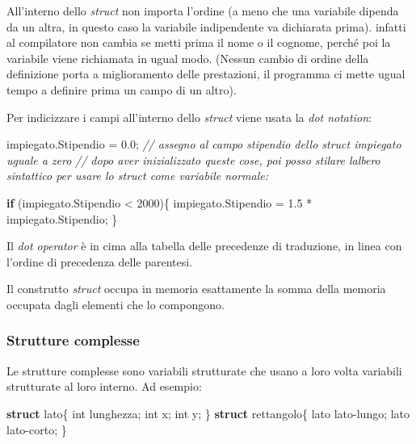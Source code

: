 \documentclass[
]{article}
\newenvironment{Shaded}{}{}
\newcommand{\CommentTok}[1]{\textcolor[rgb]{0.38,0.63,0.69}{\textit{#1}}}
\newcommand{\ControlFlowTok}[1]{\textcolor[rgb]{0.00,0.44,0.13}{\textbf{#1}}}
\newcommand{\DataTypeTok}[1]{\textcolor[rgb]{0.56,0.13,0.00}{#1}}
\newcommand{\DecValTok}[1]{\textcolor[rgb]{0.25,0.63,0.44}{#1}}
\newcommand{\FloatTok}[1]{\textcolor[rgb]{0.25,0.63,0.44}{#1}}
\newcommand{\KeywordTok}[1]{\textcolor[rgb]{0.00,0.44,0.13}{\textbf{#1}}}
\newcommand{\NormalTok}[1]{#1}
\begin{document}
All'interno dello \emph{struct} non importa l'ordine (a meno che una
variabile dipenda da un altra, in questo caso la variabile indipendente
va dichiarata prima). infatti al compilatore non cambia se metti prima
il nome o il cognome, perché poi la variabile viene richiamata in ugual
modo. (Nessun cambio di ordine della definizione porta a miglioramento
delle prestazioni, il programma ci mette ugual tempo a definire prima un
campo di un altro).

Per indicizzare i campi all'interno dello \emph{struct} viene usata la
\emph{dot notation}:

\begin{Shaded}
\begin{Highlighting}[]
\NormalTok{impiegato.Stipendio = }\FloatTok{0.0}\NormalTok{; 		}\CommentTok{// assegno al campo stipendio dello struct impiegato uguale a zero}
\CommentTok{// dopo aver inizializzato queste cose, poi posso stilare l\textquotesingle{}albero sintattico per usare lo struct come variabile normale:}

\ControlFlowTok{if}\NormalTok{ (impiegato.Stipendio \textless{} }\DecValTok{2000}\NormalTok{)\{}
\NormalTok{    impiegato.Stipendio = }\FloatTok{1.5}\NormalTok{ * impiegato.Stipendio;}
\NormalTok{\}}
\end{Highlighting}
\end{Shaded}

Il \emph{dot operator} è in cima alla tabella delle precedenze di
traduzione, in linea con l'ordine di precedenza delle parentesi.

Il construtto \emph{struct} occupa in memoria esattamente la somma della
memoria occupata dagli elementi che lo compongono.

\hypertarget{header-n616}{%
\subsubsection{Strutture complesse}\label{header-n616}}

Le strutture complesse sono variabili strutturate che usano a loro volta
variabili strutturate al loro interno. Ad esempio:

\begin{Shaded}
\begin{Highlighting}[]
\KeywordTok{struct}\NormalTok{ lato\{}
	\DataTypeTok{int}\NormalTok{ lunghezza;}
	\DataTypeTok{int}\NormalTok{ x;}
	\DataTypeTok{int}\NormalTok{ y;}
\NormalTok{\}}
\KeywordTok{struct}\NormalTok{ rettangolo\{}
\NormalTok{	lato lato{-}lungo;}
\NormalTok{	lato lato{-}corto;}
\NormalTok{\}}
\end{Highlighting}
\end{Shaded}
\end{document}
